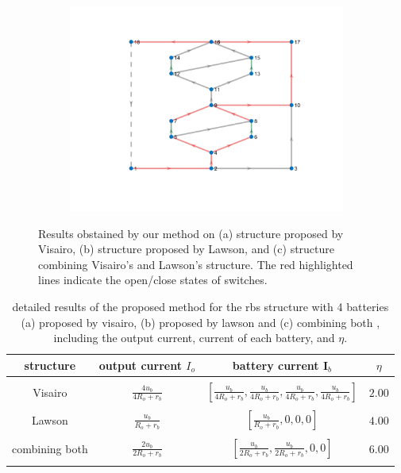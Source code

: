 \documentclass{article}
\begin{document}
\begin{figure}[htbp]
    \begin{subfigure}[b]{0.45\textwidth}
        \includegraphics[width=\textwidth]{../attachments/e2f2-dege-mac.png}
        \caption{}
        \label{fig:d-structure-e2f2}
    \end{subfigure}
    \caption{Results obstained by our method on (a) structure proposed by Visairo\cite{visairoReconfigurableBatteryPack2008}, (b) structure proposed by Lawson\cite{lawsonSoftwareConfigurableBattery2012}, and (c) structure combining Visairo's and Lawson's structure. The red highlighted lines indicate the open/close states of switches.}
    \label{fig:d-structure}
\end{figure}


\begin{table}[h]
    \centering
    \caption{detailed results of the proposed method for the rbs structure with 4 batteries (a) proposed by visairo\cite{visairoReconfigurableBatteryPack2008}, (b) proposed by lawson\cite{lawsonSoftwareConfigurableBattery2012} and (c) combining both  , including the output current, current of each battery, and $\eta$.}
    \label{tab:d-structure}
    \begin{tabular}{cccc}
        \hline
        structure &  output current $I_o$       & battery current $\bm{I}_b$       & $\eta$        \\
        \hline\\
        Visairo\cite{visairoReconfigurableBatteryPack2008} &  $\displaystyle\frac{4u_b}{4R_o + r_b}$ &  $\displaystyle\left[\frac{u_b}{4R_o + r_b},\frac{u_b}{4R_o + r_b},\frac{u_b}{4R_o + r_b},\frac{u_b}{4R_o + r_b}\right]$   & $2.00$ \\
        \\
        Lawson\cite{lawsonSoftwareConfigurableBattery2012} &  $\displaystyle\frac{u_b}{R_o + r_b}$ &  $\displaystyle\left[\frac{u_b}{R_o + r_b},0,0,0\right]$   & $4.00$ \\
        \\
        combining both &  $\displaystyle\frac{2u_b}{2R_o + r_b}$ &  $\displaystyle\left[\frac{u_b}{2R_o + r_b},\frac{u_b}{2R_o + r_b},0,0\right]$   & $6.00$ \\
        \\
        \hline
    \end{tabular}
\end{table}
\end{document}
